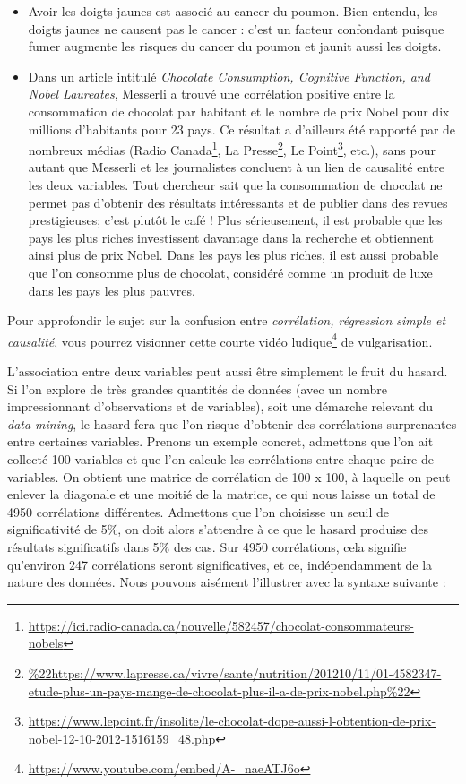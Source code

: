 \documentclass[
  11pt,
  french,
]{book}
\makeatletter
\renewcommand{\href}[2]{#2\footnote{\url{#1}}}
\newenvironment{kframev}{%
\medskip{}
\setlength{\fboxsep}{.8em}
 \def\at@end@of@kframev{}%
 \ifinner\ifhmode%
  \def\at@end@of@kframev{\end{minipage}}%
  \begin{minipage}{\columnwidth}%
 \fi\fi%
 \def\FrameCommand##1{\hskip\@totalleftmargin \hskip-\fboxsep
 \colorbox{shadebluecolor}{##1}\hskip-\fboxsep
     \hskip-\linewidth \hskip-\@totalleftmargin \hskip\columnwidth}%
 \MakeFramed {\advance\hsize-\width
   \@totalleftmargin\z@ \linewidth\hsize
   \@setminipage}}%
 {\par\unskip\endMakeFramed%
 \at@end@of@kframev}
\newenvironment{rmdblock}[1]
  {
  \begin{itemize}
  \renewcommand{\labelitemi}{
    \raisebox{-.7\height}[0pt][0pt]{
      {\setkeys{Gin}{width=3em,keepaspectratio}\texttt{[image: images/\#1]}}
    }
  }
  \setlength{\fboxsep}{1em}
  \begin{kframev}
  \small
  \item
  }
  {
  \end{kframev}
  \end{itemize}
  }
\newenvironment{bloc_attention}
  {\begin{rmdblock}{attention}}
  {\end{rmdblock}}
\makeatother
\begin{document}
\begin{bloc_attention}
\begin{itemize}
\item
  Avoir les doigts jaunes est associé au cancer du poumon. Bien entendu, les doigts jaunes ne causent pas le cancer : c'est un facteur confondant puisque fumer augmente les risques du cancer du poumon et jaunit aussi les doigts.
\item
  Dans un article intitulé \emph{Chocolate Consumption, Cognitive Function, and Nobel Laureates}, Messerli \citeyearpar{Messerli} a trouvé une corrélation positive entre la consommation de chocolat par habitant et le nombre de prix Nobel pour dix millions d'habitants pour 23 pays. Ce résultat a d'ailleurs été rapporté par de nombreux médias (\href{https://ici.radio-canada.ca/nouvelle/582457/chocolat-consommateurs-nobels}{Radio Canada}, \href{\%22https://www.lapresse.ca/vivre/sante/nutrition/201210/11/01-4582347-etude-plus-un-pays-mange-de-chocolat-plus-il-a-de-prix-nobel.php\%22}{La Presse}, \href{https://www.lepoint.fr/insolite/le-chocolat-dope-aussi-l-obtention-de-prix-nobel-12-10-2012-1516159_48.php}{Le Point}, etc.), sans pour autant que Messerli \citeyearpar{Messerli} et les journalistes concluent à un lien de causalité entre les deux variables. Tout chercheur sait que la consommation de chocolat ne permet pas d'obtenir des résultats intéressants et de publier dans des revues prestigieuses; c'est plutôt le café ! Plus sérieusement, il est probable que les pays les plus riches investissent davantage dans la recherche et obtiennent ainsi plus de prix Nobel. Dans les pays les plus riches, il est aussi probable que l'on consomme plus de chocolat, considéré comme un produit de luxe dans les pays les plus pauvres.
\end{itemize}

Pour approfondir le sujet sur la confusion entre \emph{corrélation, régression simple et causalité}, vous pourrez visionner cette courte \href{https://www.youtube.com/embed/A-_naeATJ6o}{vidéo ludique} de vulgarisation.

L'association entre deux variables peut aussi être simplement le fruit du hasard. Si l'on explore de très grandes quantités de données (avec un nombre impressionnant d'observations et de variables), soit une démarche relevant du \emph{data mining}, le hasard fera que l'on risque d'obtenir des corrélations surprenantes entre certaines variables. Prenons un exemple concret, admettons que l'on ait collecté 100 variables et que l'on calcule les corrélations entre chaque paire de variables. On obtient une matrice de corrélation de 100 x 100, à laquelle on peut enlever la diagonale et une moitié de la matrice, ce qui nous laisse un total de 4950 corrélations différentes. Admettons que l'on choisisse un seuil de significativité de 5\%, on doit alors s'attendre à ce que le hasard produise des résultats significatifs dans 5\% des cas. Sur 4950 corrélations, cela signifie qu'environ 247 corrélations seront significatives, et ce, indépendamment de la nature des données. Nous pouvons aisément l'illustrer avec la syntaxe suivante :


\end{bloc_attention}
\end{document}

